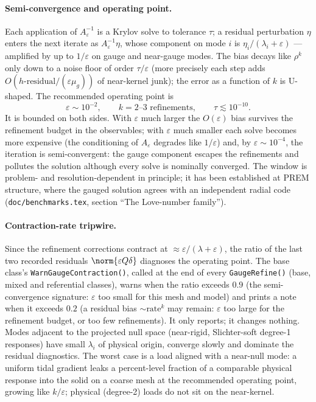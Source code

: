 \documentclass[11pt]{article}
\numberwithin{equation}{section}
\theoremstyle{remark}
\newcommand{\eps}{\varepsilon}
\newcommand{\code}[1]{\texttt{#1}}
\begin{document}
\paragraph{Semi-convergence and operating point.} Each application of
$A_\eps^{-1}$ is a Krylov solve to tolerance $\tau$; a residual
perturbation $\eta$ enters the next iterate as $A_\eps^{-1}\eta$, whose
component on mode $i$ is $\eta_i/(\lambda_i + \eps)$ --- amplified by up
to $1/\eps$ on gauge and near-gauge modes. The bias decays like $\rho^k$ only down to a
noise floor of order $\tau/\eps$ (more precisely each step adds
$O(h\text{-residual}/(\eps\mu_g))$ of near-kernel junk); the error as a
function of $k$ is U-shaped. The recommended operating point is
\begin{equation}
  \eps\sim10^{-2}, \qquad k = 2\text{--}3
  \text{ refinements}, \qquad \tau\lesssim10^{-10} .
\end{equation}
It is bounded on both sides. With $\eps$ much larger the $O(\eps)$ bias
survives the refinement budget in the observables; with $\eps$ much
smaller each solve becomes more expensive (the conditioning of $A_\eps$
degrades like $1/\eps$) and, by $\eps\sim10^{-4}$, the iteration is
semi-convergent: the gauge component escapes the refinements and
pollutes the solution although every solve is nominally converged. The
window is problem- and resolution-dependent in principle; it has been
established at PREM structure, where the gauged solution agrees with an
independent radial code (\code{doc/benchmarks.tex}, section ``The
Love-number family'').

\paragraph{Contraction-rate tripwire.} Since the refinement corrections
contract at $\approx\eps/(\lambda + \eps)$, the ratio of the last two
recorded residuals $\norm{\eps Q\delta}$ diagnoses the operating point.
The base class's \code{WarnGaugeContraction()}, called at the end of
every \code{GaugeRefine()} (base, mixed and referential classes), warns
when the ratio exceeds $0.9$
(the semi-convergence signature: $\eps$ too small for this mesh and model)
and prints a note when it exceeds $0.2$ (a residual bias $\sim
\text{rate}^k$ may remain: $\eps$ too large for the refinement budget, or
too few refinements). It only reports; it changes nothing.
Modes adjacent to the projected null space (near-rigid, Slichter-soft
degree-1 responses) have small $\lambda_i$ of physical origin, converge
slowly and dominate the residual diagnostics. The worst case is a load
aligned with a near-null mode: a uniform tidal gradient leaks a
percent-level fraction of a comparable physical response into the solid on
a coarse mesh at the recommended operating point, growing like $k/\eps$;
physical (degree-2) loads do not sit on the near-kernel.
\end{document}
